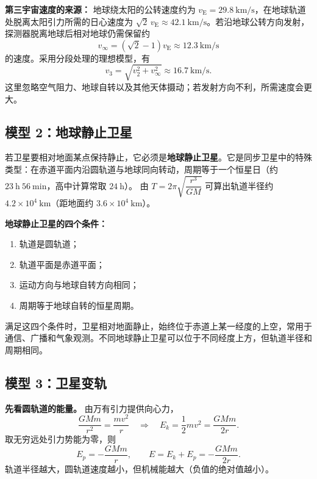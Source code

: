 \textbf{第三宇宙速度的来源：} 地球绕太阳的公转速度约为
$v_{\mathrm E}=29.8\ \mathrm{km/s}$，在地球轨道处脱离太阳引力所需的日心速度为
$\sqrt2\,v_{\mathrm E}\approx42.1\ \mathrm{km/s}$。若沿地球公转方向发射，探测器脱离地球后相对地球仍需保留约
\[
v_{\infty}=(\sqrt2-1)v_{\mathrm E}\approx12.3\ \mathrm{km/s}
\]
的速度。采用分段处理的理想模型，有
\[
\boxed{v_3=\sqrt{v_2^2+v_{\infty}^2}\approx16.7\ \mathrm{km/s}}.
\]
这里忽略空气阻力、地球自转以及其他天体摄动；若发射方向不利，所需速度会更大。

\subsection*{模型 2：地球静止卫星}

若卫星要相对地面某点保持静止，它必须是\textbf{地球静止卫星}。它是同步卫星中的特殊类型：在赤道平面内沿圆轨道与地球同向转动，周期等于一个恒星日（约 $23\ \mathrm{h}\ 56\ \mathrm{min}$，高中计算常取 $24\ \mathrm{h}$）。
由 $T = 2\pi\sqrt{\dfrac{r^3}{GM}}$ 可算出轨道半径约 $4.2 \times 10^4\ \mathrm{km}$（距地面约 $3.6 \times 10^4\ \mathrm{km}$）。

\begin{center}


\label{fig:geostationary-satellite}
\end{center}

\textbf{地球静止卫星的四个条件：}
\begin{enumerate}
  \item 轨道是圆轨道；
  \item 轨道平面是赤道平面；
  \item 运动方向与地球自转方向相同；
  \item 周期等于地球自转的恒星周期。
\end{enumerate}

满足这四个条件时，卫星相对地面静止，始终位于赤道上某一经度的上空，常用于通信、广播和气象观测。不同地球静止卫星可以位于不同经度上方，但轨道半径和周期相同。

\subsection*{模型 3：卫星变轨}

\textbf{先看圆轨道的能量。} 由万有引力提供向心力，
\[
\frac{GMm}{r^2}=\frac{mv^2}{r}
\quad\Longrightarrow\quad
E_k=\frac12mv^2=\frac{GMm}{2r}.
\]
取无穷远处引力势能为零，则
\[
E_p=-\frac{GMm}{r},
\qquad
\boxed{E=E_k+E_p=-\frac{GMm}{2r}}.
\]
轨道半径越大，圆轨道速度越小，但机械能越大（负值的绝对值越小）。

